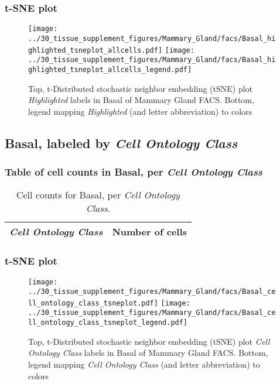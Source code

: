 \subsubsection{t-SNE plot}
\begin{figure}[h]
\centering
\texttt{[image: ../30\_tissue\_supplement\_figures/Mammary\_Gland/facs/Basal\_highlighted\_tsneplot\_allcells.pdf]}
\texttt{[image: ../30\_tissue\_supplement\_figures/Mammary\_Gland/facs/Basal\_highlighted\_tsneplot\_allcells\_legend.pdf]}
\caption{Top, t-Distributed stochastic neighbor embedding (tSNE) plot  \emph{Highlighted} labels in Basal of Mammary Gland FACS. Bottom, legend mapping \emph{Highlighted} (and letter abbreviation) to colors}
\end{figure}


\clearpage

\subsection{Basal, labeled by \emph{Cell Ontology Class}}
\subsubsection{Table of cell counts in Basal, per \emph{Cell Ontology Class}}\begin{table}[h]
\centering
\label{my-label}
\begin{tabular}{@{}ll@{}}
\toprule

\emph{Cell Ontology Class}& Number of cells \\ \midrule\bottomrule
\end{tabular}
\caption{Cell counts for Basal, per \emph{Cell Ontology Class}.}
\end{table}

\clearpage
\subsubsection{t-SNE plot}
\begin{figure}[h]
\centering
\texttt{[image: ../30\_tissue\_supplement\_figures/Mammary\_Gland/facs/Basal\_cell\_ontology\_class\_tsneplot.pdf]}
\texttt{[image: ../30\_tissue\_supplement\_figures/Mammary\_Gland/facs/Basal\_cell\_ontology\_class\_tsneplot\_legend.pdf]}
\caption{Top, t-Distributed stochastic neighbor embedding (tSNE) plot  \emph{Cell Ontology Class} labels in Basal of Mammary Gland FACS. Bottom, legend mapping \emph{Cell Ontology Class} (and letter abbreviation) to colors}
\end{figure}


